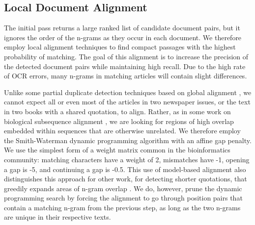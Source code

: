 \documentclass[pdftex,11pt]{article}
\begin{document}
\subsection{Local Document Alignment}
\label{sec:alignment}

The initial pass returns a large ranked list of candidate document
pairs, but it ignores the order of the n-grams as they occur in each
document.  We therefore employ local alignment techniques to find
compact passages with the highest probability of matching.  The goal
of this alignment is to increase the precision of the detected
document pairs while maintaining high recall.  Due to the high rate of
OCR errors, many n-grams in matching articles will contain slight
differences.

Unlike some partial duplicate detection techniques based on global
alignment \cite{yalniz11:_partial_duplic_detec_large_book_collec}, we
cannot expect all or even most of the articles in two newspaper
issues, or the text in two books with a shared quotation, to align.
Rather, as in some work on biological subsequence alignment
\cite{gusfield97:_algor_strin_trees_sequen}, we are looking for
regions of high overlap embedded within sequences that are otherwise
unrelated.  We therefore employ the Smith-Waterman dynamic programming
algorithm with an affine gap penalty.  We use the simplest form of a
weight matrix common in the bioinformatics community: matching
characters have a weight of 2, mismatches have -1, opening a gap is
-5, and continuing a gap is -0.5.  This use of model-based alignment
also distinguishes this approach for other work, for detecting shorter
quotations, that greedily expands areas of n-gram overlap
\cite{kolak08:_gener_links_minin_quotat,horton10:_somet_borrow}.  We
do, however, prune the dynamic programming search by forcing the
alignment to go through position pairs that contain a matching n-gram
from the previous step, as long as the two n-grams are unique in their
respective texts.
\end{document}
